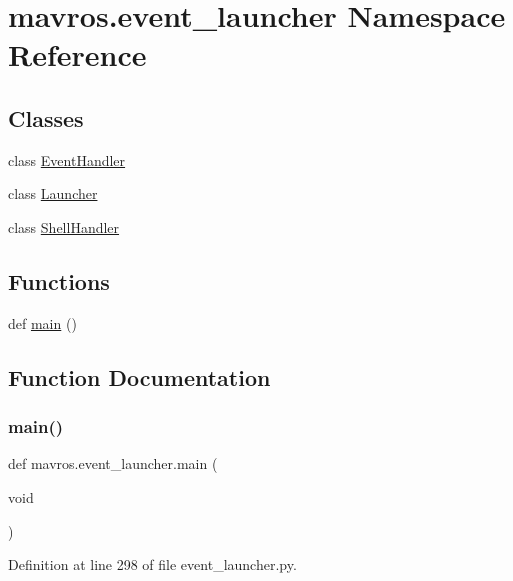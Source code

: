 \hypertarget{namespacemavros_1_1event__launcher}{}\section{mavros.\+event\+\_\+launcher Namespace Reference}
\label{namespacemavros_1_1event__launcher}
\subsection*{Classes}
\begin{DoxyCompactItemize}
\item 
class \mbox{\hyperlink{classmavros_1_1event__launcher_1_1EventHandler}{Event\+Handler}}
\item 
class \mbox{\hyperlink{classmavros_1_1event__launcher_1_1Launcher}{Launcher}}
\item 
class \mbox{\hyperlink{classmavros_1_1event__launcher_1_1ShellHandler}{Shell\+Handler}}
\end{DoxyCompactItemize}
\subsection*{Functions}
\begin{DoxyCompactItemize}
\item 
def \mbox{\hyperlink{namespacemavros_1_1event__launcher_a49ab761fab4c0f72fe193ef48ef31be1}{main}} ()
\end{DoxyCompactItemize}


\subsection{Function Documentation}
\mbox{\label{namespacemavros_1_1event__launcher_a49ab761fab4c0f72fe193ef48ef31be1}} 
\subsubsection{\texorpdfstring{main()}{main()}}
{\footnotesize\ttfamily def mavros.\+event\+\_\+launcher.\+main (\begin{DoxyParamCaption}\item[{void}]{ }\end{DoxyParamCaption})}



Definition at line 298 of file event\+\_\+launcher.\+py.

